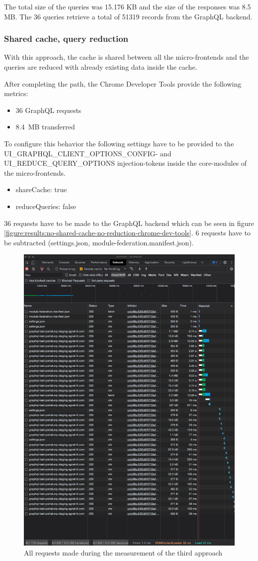 The total size of the queries was 15.176 KB and the size of the responses was 8.5 MB. The 36 queries retrieve a total of 51319 records from the GraphQL backend.

\subsubsection{Shared cache, query reduction}

With this approach, the cache is shared between all the micro-frontends and the queries are reduced with already existing data inside the cache.

After completing the path, the Chrome Developer Tools provide the following metrics:

\begin{itemize}
    \item 36 GraphQL requests
    \item 8.4 MB transferred
\end{itemize}

 To configure this behavior the following settings have to be provided to the UI\_GRAPHQL\_CLIENT\_OPTIONS\_CONFIG- and UI\_REDUCE\_QUERY\_OPTIONS injection-tokens inside the core-modules of the micro-frontends.

\begin{itemize}
    \item shareCache: true
    \item reduceQueries: false
\end{itemize}

36 requests have to be made to the GraphQL backend which can be seen in figure \ref{figure:results:no-shared-cache-no-reduction-chrome-dev-tools}. 6 requests have to be subtracted (settings.json, module-federation.manifest.json).

\ifshowImages
\begin{figure}[H]
\centering
\includegraphics[width=0.6\linewidth]{images/1-attempt/shared-reduced-cache.png}
\caption{All requests made during the measurement of the third approach}\label{figure:results:shared-cache-reduction-chrome-dev-tools}
\end{figure}
\fi

